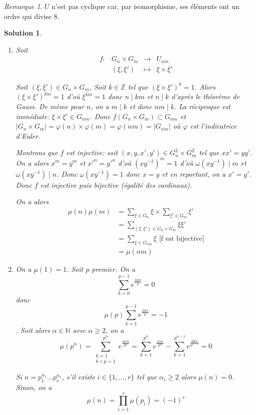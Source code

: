 \documentclass[12pt]{article}
\newtheorem{solution}{Solution}[section]
\theoremstyle{remark}
\newtheorem{remark}{Remarque}[section]
\newcommand{\N}{\mathbb{N}} \newcommand{\Z}{\mathbb{Z}}
\newcommand{\function}[5]{
	$$
	\begin{array}{rccl}
		#1: & #2 & \to & #3 \\
		& #4 & \mapsto & #5
	\end{array}
	$$
}
\numberwithin{equation}{section}
\begin{document}
\begin{remark}
	$U$ n'est pas cyclique car, par isomorphisme, ses éléments ont un ordre qui divise 8.
\end{remark}

\begin{solution}
	\phantom{}
	\begin{enumerate}
		\item Soit \function{f}{G_{n}\times G_{m}}{U_{nm}}{(\xi,\xi')}{\xi\times\xi'}
		Soit $(\xi,\xi')\in G_{n}\times G_{m}$, Soit $k\in\Z$ tel que $(\xi\times\xi')^{k}=1$. Alors $(\xi\times\xi')^{km}=1$ d'où $\xi^{km}=1$ donc $n\mid km$ et $n\mid k$ d'après le théorème de Gauss. De même pour $n$, on a $m\mid k$ et donc $nm\mid k$. La réciproque est immédiate: $\xi\times\xi'\in G_{nm}$. Donc $f(G_{n}\times G_{m})\subset G_{nm}$ et $\vert G_{n}\times G_{m}\vert=\varphi(n)\times\varphi(m)=\varphi(nm)=\vert G_{nm}\vert$ où $\varphi$ est l'indicatrice d'Euler.

		Montrons que $f$ est injective: soit $(x,y,x',y')\in G_{n}^{2}\times G_{m}^{2}$ tel que $xx'=yy'$. On a alors $x^{m}=y^{m}$ et $x'^{n}=y'^{n}$ d'où $(xy^{-1})^{m}=1$ d'où $\omega(xy^{-1})\mid m$ et $\omega(xy^{-1})\mid n$. Donc $\omega(xy^{-1})=1$ donc $x=y$ et en reportant, on a $x'=y'$. Donc $f$ est injective puis bijective (égalité des cardinaux).

		On a alors 
		\begin{align*}
			\mu(n)\mu(m)
			&=\sum_{\xi\in G_{n}}\xi\times\sum_{\xi'\in G_{m}}\xi'\\
			&=\sum_{(\xi,\xi')\in G_{n}\times G_{m}}\xi\xi'\\
			&=\sum_{\xi\in G_{nm}}\xi\text{ [f est bijective]}\\
			&=\mu(nm)
		\end{align*}

		\item On a $\mu(1)=1$. Soit $p$ premier. On a 
		$$\sum_{k=0}^{p-1}e^{\frac{2\mathrm{i}k\pi}{p}}=0$$ 
		donc 
		$$\mu(p)\sum_{k=1}^{p-1}e^{\frac{2\mathrm{i}k\pi}{p}}=-1$$. Soit alors $\alpha\in\N$ avec $\alpha\geqslant2$, on a 
		$$\mu(p^{\alpha})=\sum_{\substack{k=1\\ k\wedge p=1}}^{p^{\alpha}}e^{\frac{2\mathrm{i}k\pi}{p^{\alpha}}}=\sum_{k=1}^{p^{\alpha}}e^{\frac{2\mathrm{i}k\pi}{p^{\alpha}}}-\sum_{k=1}^{p^{\alpha-1}}e^{\frac{2\mathrm{i}k\pi}{p^{\alpha-1}}}=0$$

		Si $n=p_{1}^{\alpha_{1}}\dots p_{r}^{\alpha_{r}}$, s'il existe $i\in\{1,\dots,r\}$ tel que $\alpha_{i}\geqslant2$ alors $\mu(n)=0$. Sinon, on a 
		$$\mu(n)=\prod_{i=1}^{r}\mu(p_{i})=(-1)^{r}$$


\end{enumerate}
\end{solution}
\end{document}
